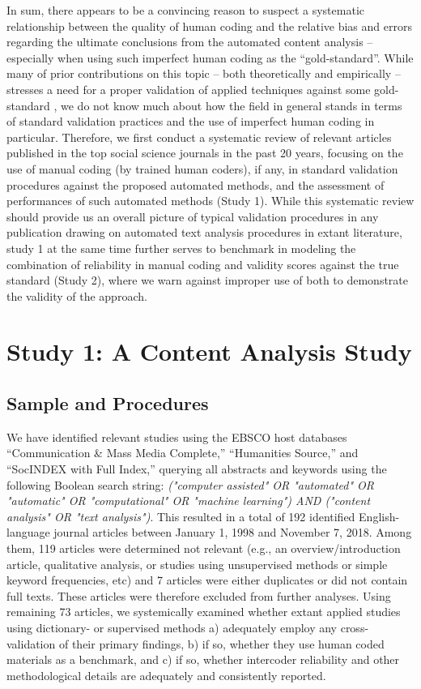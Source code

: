\documentclass[man, 12pt, a4paper, nolmodern, noextraspace]{apa6}
\begin{document}
    In sum, there appears to be a convincing reason to suspect a systematic relationship between the quality of human coding and the relative bias and errors regarding the ultimate conclusions from the automated content analysis -- especially when using such imperfect human coding as the ``gold-standard''. While many of prior contributions on this topic -- both theoretically and empirically -- stresses a need for a proper validation of applied techniques against some gold-standard \parencites[e.g.,][]{grimmer2013text, Hopkins_King2010, gonzalez2015signals}, we do not know much about how the field in general stands in terms of standard validation practices and the use of imperfect human coding in particular. Therefore, we first conduct a systematic review of relevant articles published in the top social science journals in the past 20 years, focusing on the use of manual coding (by trained human coders), if any, in standard validation procedures against the proposed automated methods, and the assessment of performances of such automated methods (Study 1). While this systematic review should provide us an overall picture of typical validation procedures in any publication drawing on automated text analysis procedures in extant literature, study 1 at the same time further serves to benchmark in modeling the combination of reliability in manual coding and validity scores against the true standard (Study 2), where we warn against improper use of both to demonstrate the validity of the approach.

\section{Study 1: A Content Analysis Study}

\subsection{Sample and Procedures}

    We have identified relevant studies using the EBSCO host databases “Communication \& Mass Media Complete,” “Humanities Source,” and “SocINDEX with Full Index,” querying all abstracts and keywords using the following Boolean search string: \textit{("computer assisted" OR "automated" OR "automatic" OR "computational" OR "machine learning") AND ("content analysis" OR "text analysis")}. This resulted in a total of 192 identified English-language journal articles between January 1, 1998 and November 7, 2018. Among them, 119 articles were determined not relevant (e.g., an overview/introduction article, qualitative analysis, or studies using unsupervised methods or simple keyword frequencies, etc) and 7 articles were either duplicates or did not contain full texts. These articles were therefore excluded from further analyses. Using remaining 73 articles, we systemically examined whether extant applied studies using dictionary- or supervised methods a) adequately employ any cross-validation of their primary findings, b) if so, whether they use human coded materials as a benchmark, and c) if so, whether intercoder reliability and other methodological details are adequately and consistently reported. 
    
\end{document}
